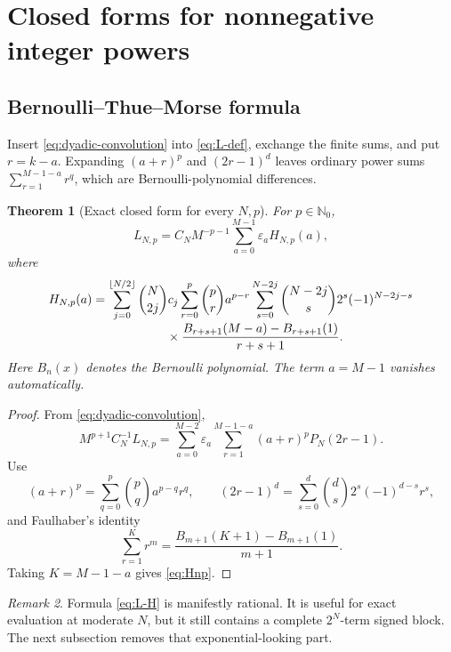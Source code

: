 \documentclass[11pt,oneside]{article}
\numberwithin{equation}{section}
\newtheorem{theorem}{Theorem}[section]
\theoremstyle{definition}
\theoremstyle{remark}
\newtheorem{remark}[theorem]{Remark}
\newcommand{\N}{\mathbb N}
\begin{document}
\section{Closed forms for nonnegative integer powers}
\label{sec:integer}

\subsection{Bernoulli--Thue--Morse formula}

Insert \eqref{eq:dyadic-convolution} into \eqref{eq:L-def}, exchange the finite sums,
and put \(r=k-a\).  Expanding \((a+r)^p\) and \((2r-1)^d\) leaves ordinary power sums
\(\sum_{r=1}^{M-1-a}r^q\), which are Bernoulli-polynomial differences.

\begin{theorem}[Exact closed form for every \(N,p\)]
\label{thm:bernoulli-TM}
For \(p\in\N_0\),
\begin{equation}
 \boxed{\displaystyle
 L_{N,p}=C_NM^{-p-1}
 \sum_{a=0}^{M-1}\varepsilon_a H_{N,p}(a),}
 \label{eq:L-H}
\end{equation}
where
\begin{align}
 H_{N,p}(a)
 &=\sum_{j=0}^{\lfloor N/2\rfloor}\binom N{2j}c_j
   \sum_{r=0}^{p}\binom pr a^{p-r}
   \sum_{s=0}^{N-2j}\binom{N-2j}{s}2^s(-1)^{N-2j-s}
 \notag\\[-0.25em]
 &\qquad\qquad\qquad\times
 \frac{B_{r+s+1}(M-a)-B_{r+s+1}(1)}{r+s+1}.
 \label{eq:Hnp}
\end{align}
Here \(B_n(x)\) denotes the Bernoulli polynomial.  The term \(a=M-1\) vanishes
automatically.
\end{theorem}

\begin{proof}
From \eqref{eq:dyadic-convolution},
\[
 M^{p+1}C_N^{-1}L_{N,p}
 =\sum_{a=0}^{M-2}\varepsilon_a
 \sum_{r=1}^{M-1-a}(a+r)^pP_N(2r-1).
\]
Use
\[
 (a+r)^p=\sum_{q=0}^{p}\binom pq a^{p-q}r^q,
 \qquad
 (2r-1)^d=\sum_{s=0}^{d}\binom ds2^s(-1)^{d-s}r^s,
\]
and Faulhaber's identity
\begin{equation}
 \sum_{r=1}^{K}r^m
 =\frac{B_{m+1}(K+1)-B_{m+1}(1)}{m+1}.
 \label{eq:faulhaber-B1}
\end{equation}
Taking \(K=M-1-a\) gives \eqref{eq:Hnp}.
\end{proof}

\begin{remark}
Formula \eqref{eq:L-H} is manifestly rational.  It is useful for exact evaluation at
moderate \(N\), but it still contains a complete \(2^N\)-term signed block.  The next
subsection removes that exponential-looking part.
\end{remark}
\end{document}
